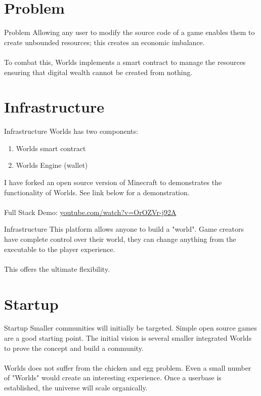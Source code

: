 \documentclass[final, xcolor=pdftex, dvipsnames, table, aspectratio=169, 14pt]{beamer}
\begin{document}
\section{Problem}
\begin{frame}{Problem}
Allowing any user to modify the source code of a game enables them to create unbounded resources; this creates an economic imbalance. 
\\~\\
To combat this, Worlds implements a smart contract to manage the resources ensuring that digital wealth cannot be created from nothing.  
\end{frame}

\section{Infrastructure}
\begin{frame}{Infrastructure}
Worlds has two components: 
\begin{enumerate}
\item Worlds smart contract
\item Worlds Engine (wallet)
\end{enumerate}
\vfill 
I have forked an open source version of Minecraft to demonstrates the functionality of Worlds. See link below for a demonstration.
\\~\\
\footnotesize
Full Stack Demo:
\href{https://www.youtube.com/watch?v=OrOZVr-j92A}{youtube.com/watch?v=OrOZVr-j92A}\label{vid}

\end{frame}

\begin{frame}{Infrastructure}
This platform allows anyone to build a "world". Game creators have complete control over their world, they can change anything from the executable to the player experience.
\\~\\
This offers the ultimate flexibility.
\end{frame}

\section{Startup}
\begin{frame}{Startup}
Smaller communities will initially be targeted. Simple open source games are a good starting point. The initial vision is several smaller integrated Worlds to prove the concept and build a community.
\\~\\
Worlds does not suffer from the chicken and egg problem. Even a small number of "Worlds" would create an interesting experience. Once a userbase is established, the universe will scale organically.
\end{frame}
\end{document}
